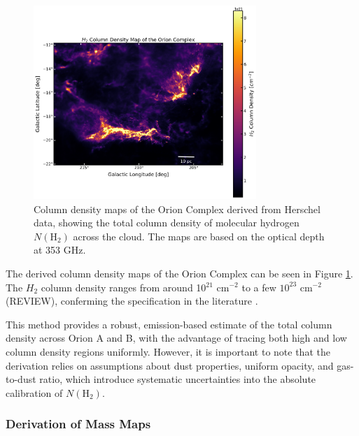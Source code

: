 \begin{figure}[t]
    \centering
    \includegraphics[width=0.75\textwidth]{figures/column_density_map.png}
    \caption{Column density maps of the Orion Complex derived from Herschel data, showing the total column density of molecular hydrogen $N(\mathrm{H}_2)$ across the cloud. The maps are based on the optical depth at 353 GHz.}
    \label{fig:n_h2_final_map}
\end{figure}

The derived column density maps of the Orion Complex can be seen in Figure \ref{fig:n_h2_final_map}. The $H_2$ column density ranges from around 10$^{21}$ cm$^{-2}$ to a few $10^{23}$ cm$^{-2}$ (REVIEW), conferming the specification in the literature \cite{lombardi2014herschel}. 

This method provides a robust, emission-based estimate of the total column density across Orion A and B, with the advantage of tracing both high and low column density regions uniformly.
However, it is important to note that the derivation relies on assumptions about dust properties, uniform opacity, and gas-to-dust ratio, which introduce systematic uncertainties into the absolute calibration of $N(\mathrm{H}_2)$.


\subsubsection{Derivation of Mass Maps}

